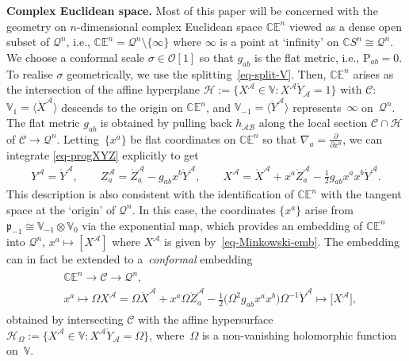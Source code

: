 \documentclass[pdftex]{sigma}
\numberwithin{equation}{section}
\newcommand{\parderv}[2] {\frac{\partial#1}{\partial#2}}
\newcommand{\mc} [1]{\mathcal{#1}}
\newcommand{\mr}[1] {\mathring{#1}}
\newcommand{\Rho} {\mathrm{P}}
\newcommand{\mfp} {\mathfrak{p}}
\newcommand{\E} {\mathbb{E}}
\newcommand{\C} {\mathbb{C}}
\newcommand{\V} {\mathbb{V}}
\begin{document}
{\bf Complex Euclidean space.} %
Most of this paper will be concerned with the geometry on $n$-dimensional complex Euclidean space $\C \E^n$ viewed as a dense open subset of $\mc{Q}^n$, i.e., $\C \E^n = \mc{Q}^n \setminus \{\infty\}$ where $\infty$ is a point at `inf\/inity' on $\C S^n \cong \mc{Q}^n$. We choose a conformal scale $\sigma \in \mc{O}[1]$ so that $g_{ab}$ is the f\/lat metric, i.e., $\Rho_{ab}=0$. To realise $\sigma$ geometrically, we use the splitting~\eqref{eq-split-V}. Then, $\C \E^n$ arises as the intersection of the af\/f\/ine hyperplane $\mc{H} := \{ X^\mc{A} \in \V \colon X^\mc{A} \mr{Y}_\mc{A} = 1 \}$ with $\mc{C}$: $\V_1 = \langle \mr{X}^\mc{A} \rangle$ descends to the origin on $\C \E^n$, and $\V_{-1} = \langle \mr{Y}^\mc{A} \rangle$ represents~$\infty$ on~$\mc{Q}^n$. The f\/lat metric $g_{ab}$ is obtained by pulling back $h_{\mc{A} \mc{B}}$ along the local section $\mc{C} \cap \mc{H}$ of $\mc{C} \rightarrow \mc{Q}^n $. Let\-ting~$\{ x^a \}$ be f\/lat coordinates on $\C \E^n$ so that $\nabla_a = \parderv{}{x^a}$, we can integrate \eqref{eq-progXYZ} explicitly to get
\begin{gather}\label{eq-Minkowski-emb}
Y^\mc{A} = \mr{Y}^\mc{A} , \qquad Z^\mc{A}_a = \mr{Z}^\mc{A}_a - g_{ab} x^b \mr{Y}^\mc{A} , \qquad X^\mc{A} = \mr{X}^\mc{A} + x^a \mr{Z}^\mc{A}_a - \tfrac{1}{2} g_{ab} x^a x^b \mr{Y}^\mc{A} .
\end{gather}
This description is also consistent with the identif\/ication of $\C\E^n$ with the tangent space at the `origin' of $\mc{Q}^n$. In this case, the coordinates $\{ x^a \}$ arise from $\mfp_{-1} \cong \V_{-1} \otimes \V_0$ via the exponential map, which provides an embedding of $\C\E^n$ into $\mc{Q}^n$, $x^a \mapsto [ X^\mc{A}]$ where $X^\mc{A}$ is given by~\eqref{eq-Minkowski-emb}. The embedding can in fact be extended to a~\emph{conformal} embedding
\begin{gather*}
\begin{split}&
\C \E^n \rightarrow \mc{C} \rightarrow \mc{Q}^n , \\
& x^a \mapsto \Omega X^\mc{A} = \Omega \mr{X}^\mc{A} + x^a \Omega \mr{Z} _a^\mc{A} - \tfrac{1}{2} \big( \Omega^2 g_{ab} x^a x^b \big) \Omega^{-1} \mr{Y}^\mc{A} \mapsto \big[X^\mc{A}\big],
\end{split}
\end{gather*}
obtained by intersecting $\mc{C}$ with the af\/f\/ine hypersurface $\mc{H}_{\Omega} := \{ X^\mc{A} \in \V \colon X^\mc{A} \mr{Y}_\mc{A} = \Omega \}$, where~$\Omega$ is a non-vanishing holomorphic function on~$\V$.
\end{document}
